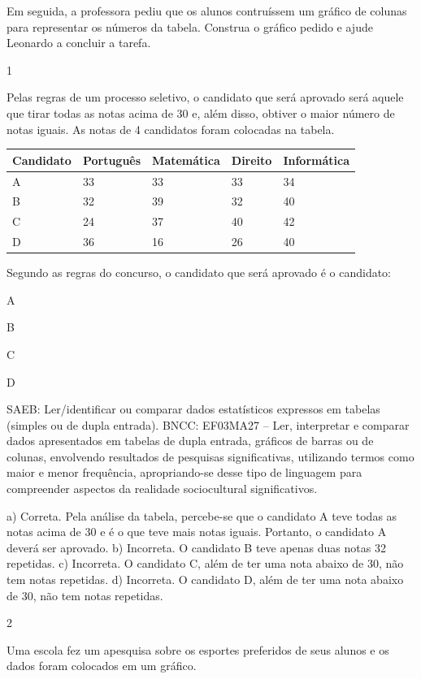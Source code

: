 \begin{multicols}{2}
\begin{enumerate}
{Em seguida, a professora pediu que os alunos contruíssem um gráfico de
colunas para representar os números da tabela. Construa o gráfico pedido
e ajude Leonardo a concluir a tarefa.



\num{1}

Pelas regras de um processo seletivo, o candidato que será aprovado será
aquele que tirar todas as notas acima de 30 e, além disso, obtiver o maior
número de notas iguais. As notas de 4 candidatos foram colocadas na
tabela.

\begin{longtable}[]{@{}lllll@{}}
\toprule
Candidato & Português & Matemática & Direito &
Informática\tabularnewline
\midrule
\endhead
A & 33 & 33 & 33 & 34\tabularnewline
B & 32 & 39 & 32 & 40\tabularnewline
C & 24 & 37 & 40 & 42\tabularnewline
D & 36 & 16 & 26 & 40\tabularnewline
\bottomrule
\end{longtable}

Segundo as regras do concurso, o candidato que será aprovado é o
candidato:

\begin{escolha}
\item
  A
\item
  B
\item
  C
\item
  D
\end{escolha}

SAEB: Ler/identificar ou comparar dados estatísticos expressos em tabelas (simples ou de dupla entrada). 
BNCC: EF03MA27 -- Ler, interpretar e comparar dados apresentados em tabelas de dupla entrada,
gráficos de barras ou de colunas, envolvendo resultados de pesquisas significativas, utilizando
termos como maior e menor frequência, apropriando-se desse tipo de linguagem para
compreender aspectos da realidade sociocultural significativos.


a) Correta. Pela análise da tabela, percebe-se que o candidato A teve todas as notas
acima de 30 e é o que teve mais notas iguais. Portanto, o candidato A
deverá ser aprovado.
b) Incorreta. O candidato B teve apenas duas notas 32 repetidas.
c) Incorreta. O candidato C, além de ter uma nota abaixo de 30, não tem notas repetidas.
d) Incorreta. O candidato D, além de ter uma nota abaixo de 30, não tem notas repetidas.

\num{2}

Uma escola fez um apesquisa sobre os esportes preferidos de seus alunos
e os dados foram colocados em um gráfico.

}
\end{enumerate}
\end{multicols}
